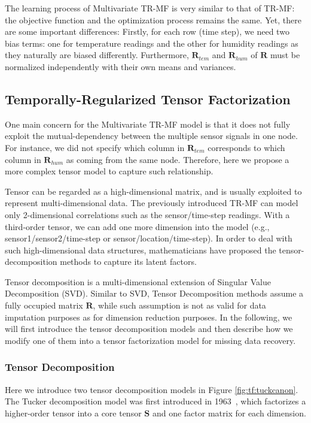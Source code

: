 The learning process of Multivariate TR-MF is very similar to that of TR-MF: the objective function and the optimization process remains the same. Yet, there are some important differences: 
Firstly, for each row (time step), we need two bias terms: one for temperature readings and the other for humidity readings as they naturally are biased differently. Furthermore, $\mathbf{R}_{tem}$ and $\mathbf{R}_{hum}$ of $\mathbf{R}$ must be normalized independently with their own means and variances. 

 
\subsection{Temporally-Regularized Tensor Factorization} \label{sec:tensordecomp}

One main concern for the Multivariate TR-MF model is that it does not fully exploit the mutual-dependency between the multiple sensor signals in one node. For instance, we did not specify which column in $\mathbf{R}_{tem}$ corresponds to which column in $\mathbf{R}_{hum}$ as coming from the same node. Therefore, here we propose a more complex tensor model to capture such relationship. 

Tensor can be regarded as a high-dimensional matrix, and is usually exploited to represent multi-dimensional data. The previously introduced TR-MF can model only 2-dimensional correlations such as the sensor/time-step readings. With a third-order tensor, we can add one more dimension into the model (e.g., sensor1/sensor2/time-step or sensor/location/time-step). In order to deal with such high-dimensional data structures, mathematicians have proposed the tensor-decomposition methods to capture its latent factors. 

Tensor decomposition is a multi-dimensional extension of Singular Value Decomposition (SVD). Similar to SVD, Tensor Decomposition methods assume a fully occupied matrix $\mathbf{R}$, while such assumption is not as valid for data imputation purposes as for dimension reduction purposes.
In the following, we will first introduce the tensor decomposition models and then describe how we modify one of them into a tensor factorization model for missing data recovery. 

 
\subsubsection{Tensor Decomposition}
Here we introduce two tensor decomposition models in Figure \ref{fig:tf:tuckcanon}. The Tucker decomposition model was first introduced in 1963~\cite{tucker1963implications}, which factorizes a higher-order tensor into a core tensor $\mathbf{S}$ and one factor matrix for each dimension.


